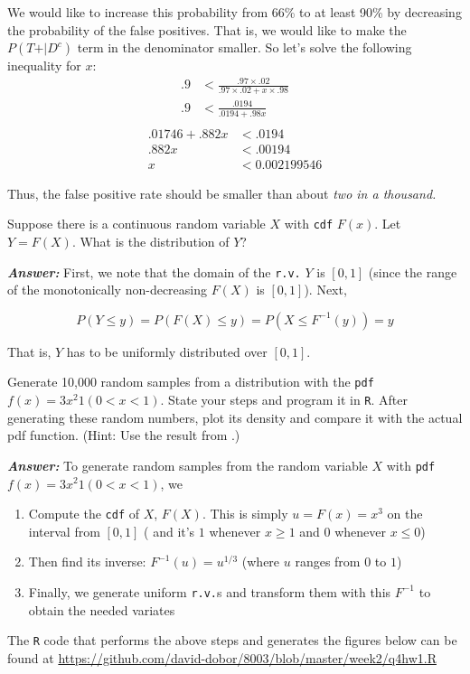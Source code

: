 \documentclass[12pt]{article}
\newenvironment{question}[2][Question]{\begin{trivlist}
\item[\hskip \labelsep {\bfseries #1}\hskip \labelsep {\bfseries #2.}]}{\end{trivlist}}
\begin{document}
 We would like to increase this probability from 66\% to at least 90\% by decreasing the probability of the false positives. That is, we would like to make the $P(T\text{+} | D^c)$ term in the denominator smaller. So let's solve the following inequality for $x$:
 \begin{align*}
 .9 &< \frac{.97 \times .02}{.97 \times .02 + x\times .98}\\
 .9 &< \frac{.0194} { .0194 +  .98x}\\
\end{align*}
 \begin{align*} 
.01746 + .882 x &<  .0194 \\
.882 x &< .00194 \\
x &< 0.002199546
\end{align*}

Thus, the false positive rate should be smaller than about \emph{two in a thousand.}


\bigskip
\bigskip
\begin{question}{2.3} Suppose there is a continuous random variable $X$ with \texttt{cdf} $F(x) $. Let $ Y = F(X) $. What is the distribution of $Y$? 
\end{question}

\textbf{\color{TealBlue}\emph{Answer:} } 
First, we note that the domain of the \texttt{r.v.} $Y$ is $[0, 1]$ (since the range of the monotonically non-decreasing $F(X)$ is $[0, 1]$).  Next, 


$$
P ( Y \leq y ) = P( F(X) \leq y) = P( X \leq F^{-1}(y) ) = y
$$

That is, $Y$ has to be uniformly distributed over $[0, 1]$. %


\bigskip
\bigskip
\begin{question}{2.4} 
Generate 10,000 random samples from a distribution with the \texttt{pdf} $f(x) = 3 x^2 1(0 < x < 1) $. State your steps and program it in \texttt{R}. After generating these random numbers, plot its density and compare it with the actual pdf function. (Hint: Use the result from \color{Red}{Problem 4? (should this be the previous problem, problem 3?}.)

\end{question}


\textbf{\color{TealBlue}\emph{Answer:} } To generate random samples from the random variable $X$ with \texttt{pdf} $f(x) = 3 x^2 1(0 < x < 1) $, we 

\begin{enumerate}
\item Compute the \texttt{cdf} of $X$, $F(X)$. This is simply $u = F(x) = x^3$ on the interval from $[0,1]$ ( and it's $1$ whenever $x \geq 1$ and $0$ whenever $x \leq 0$)
\item Then find its inverse: $F^{-1}(u) = u^{1/3}$ (where $u$ ranges from $0$ to $1$)
\item Finally, we generate uniform \texttt{r.v.}s and transform them with this $F^{-1}$ to obtain the needed variates
\end{enumerate} 
 The \texttt{R} code that performs the above steps and generates the figures below can be found at \url{https://github.com/david-dobor/8003/blob/master/week2/q4hw1.R} 
 
\end{document}
